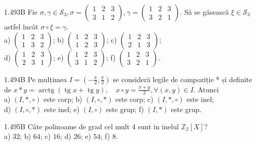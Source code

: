 \documentclass[11pt]{article}
\begin{document}
1.493B Fie $\sigma, \gamma \in \mathcal{S}_{3}, \sigma=\left(\begin{array}{lll}1 & 2 & 3 \\ 3 & 1 & 2\end{array}\right), \gamma=\left(\begin{array}{lll}1 & 2 & 3 \\ 3 & 2 & 1\end{array}\right)$. Să se găsească $\xi \in \mathcal{S}_{3}$ astfel încât $\sigma \circ \xi=\gamma$.\\ a) $\left(\begin{array}{lll}1 & 2 & 3 \\ 1 & 3 & 2\end{array}\right)$; b) $\left(\begin{array}{lll}1 & 2 & 3 \\ 1 & 2 & 3\end{array}\right)$; c) $\left(\begin{array}{lll}1 & 2 & 3 \\ 2 & 1 & 3\end{array}\right)$;\\ d) $\left(\begin{array}{lll}1 & 2 & 3 \\ 2 & 3 & 1\end{array}\right)$; e) $\left(\begin{array}{lll}1 & 2 & 3 \\ 3 & 1 & 2\end{array}\right)$; f) $\left(\begin{array}{lll}1 & 2 & 3 \\ 3 & 2 & 1\end{array}\right)$.

1.494B Pe mulțimea $I=\left(-\frac{\pi}{2}, \frac{\pi}{2}\right)$ se consideră legile de compoziție * și definite de $x * y=\operatorname{arctg}(\operatorname{tg} x+\operatorname{tg} y), \quad x \circ y=\frac{x+y}{2}, \forall(x, y) \in I$. Atunci\\ a) $(I, *, \circ)$ este corp; b) $(I, \circ, *)$ este corp; c) $(I, *, \circ)$ este inel;\\ d) $(I, \circ, *)$ este inel; e) $(I, \circ)$ este grup; f) $(I, *)$ este grup.

1.495B Câte polinoame de grad cel mult 4 sunt in inelul $\mathbb{Z}_{2}[X]$?\\ a) $32$; b) $64$; c) $16$; d) $26$; e) $54$; f) $8$. 
\end{document}
